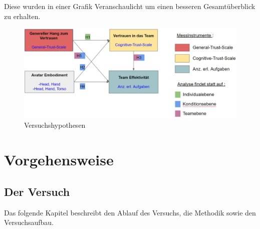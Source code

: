 \documentclass[a4paper,11pt]{article}%
\renewcommand{\\}{\vspace*{0.5\baselineskip} \newline}
\begin{document}
%


Diese wurden in einer Grafik Veranschaulicht um einen besseren Gesamtüberblick zu erhalten.

\begin{figure}[H]
		\begin{footnotesize}
			\includegraphics[width=\textwidth]{Abbildungen/Versuchshypothesen_02.JPG}\\
			\caption{Versuchshypothesen}
			\label{Versuchshypothesen}
		\end{footnotesize}
	\end{figure}	

\newpage
	\section{Vorgehensweise}
	\subsection{Der Versuch}
	
Das folgende Kapitel beschreibt den Ablauf des Versuchs, die Methodik sowie den Versuchsaufbau.
\end{document}
